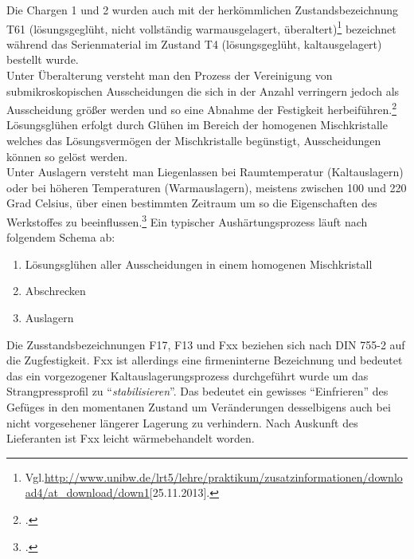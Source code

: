 \documentclass[12pt,a4paper,parskip]{scrartcl}
\begin{document}
{\begin{table}[htbp]
\begin{tabular}{lllll}
\end{tabular}
\end{table}


 Die Chargen 1 und 2 wurden auch mit der herkömmlichen Zustandsbezeichnung T61 (lösungsgeglüht, nicht vollständig warmausgelagert, überaltert)\footnote{Vgl.\url{http://www.unibw.de/lrt5/lehre/praktikum/zusatzinformationen/download4/at_download/down1}[25.11.2013].} bezeichnet während das Serienmaterial im Zustand T4 (lösungsgeglüht, kaltausgelagert) bestellt wurde. \\
 Unter Überalterung versteht man  den Prozess der Vereinigung von  submikroskopischen Ausscheidungen die sich  in der Anzahl verringern jedoch als Ausscheidung größer werden und so eine Abnahme der Festigkeit herbeiführen.\footcite[Vgl.][52]{wki}\\
  Lösungsglühen erfolgt durch Glühen im Bereich der homogenen Mischkristalle welches das   Lösungsvermögen der Mischkristalle begünstigt, Ausscheidungen können so gelöst werden.\\
   Unter Auslagern versteht man Liegenlassen bei Raumtemperatur (Kaltauslagern) oder bei  höheren Temperaturen (Warmauslagern), meistens zwischen 100 und 220 Grad Celsius, über einen bestimmten Zeitraum um so die Eigenschaften des Werkstoffes zu beeinflussen.\footcite[Vgl.][213]{wk}
Ein typischer Aushärtungsprozess läuft nach folgendem Schema ab:

\begin{enumerate}
 \item Lösungsglühen aller Ausscheidungen in einem homogenen Mischkristall 
 \item Abschrecken
 \item Auslagern 
 \end{enumerate}
 
   
 
 

Die Zusstandsbezeichnungen F17, F13 und Fxx beziehen sich nach DIN 755-2 auf die Zugfestigkeit. Fxx ist allerdings eine firmeninterne Bezeichnung und bedeutet das ein  vorgezogener Kaltauslagerungsprozess durchgeführt wurde um das Strangpressprofil zu "`\emph{stabilisieren}"'. Das bedeutet ein gewisses "`Einfrieren"' des Gefüges in den momentanen Zustand um Veränderungen desselbigens auch bei nicht vorgesehener längerer Lagerung zu verhindern. Nach Auskunft des Lieferanten ist Fxx leicht wärmebehandelt worden.


}
\end{document}
